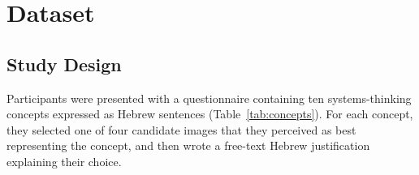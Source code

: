 \documentclass[12pt,a4paper]{article}
\begin{document}
\section{Dataset}

\subsection{Study Design}

Participants were presented with a questionnaire containing ten systems-thinking
concepts expressed as Hebrew sentences (Table~\ref{tab:concepts}).  For each concept,
they selected one of four candidate images that they perceived as best representing the
concept, and then wrote a free-text Hebrew justification explaining their choice.
\end{document}
